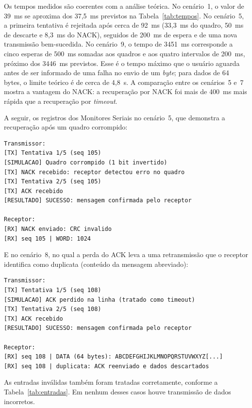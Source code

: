 \documentclass[12pt]{article}
\begin{document}
Os tempos medidos são coerentes com a análise teórica. No cenário~1, o valor de 39~ms se aproxima dos 37,5~ms previstos na Tabela~\ref{tab:tempos}. No cenário~5, a primeira tentativa é rejeitada após cerca de 92~ms (33,3~ms do quadro, 50~ms de descarte e 8,3~ms do NACK), seguidos de 200~ms de espera e de uma nova transmissão bem-sucedida. No cenário~9, o tempo de 3451~ms corresponde a cinco esperas de 500~ms somadas aos quadros e aos quatro intervalos de 200~ms, próximo dos 3446~ms previstos. Esse é o tempo máximo que o usuário aguarda antes de ser informado de uma falha no envio de um \emph{byte}; para dados de 64 bytes, o limite teórico é de cerca de 4,8~s. A comparação entre os cenários~5 e~7 mostra a vantagem do NACK: a recuperação por NACK foi mais de 400~ms mais rápida que a recuperação por \emph{timeout}.

A seguir, os registros dos Monitores Seriais no cenário~5, que demonstra a recuperação após um quadro corrompido:

\begin{small}
\begin{verbatim}
Transmissor:
[TX] Tentativa 1/5 (seq 105)
[SIMULACAO] Quadro corrompido (1 bit invertido)
[TX] NACK recebido: receptor detectou erro no quadro
[TX] Tentativa 2/5 (seq 105)
[TX] ACK recebido
[RESULTADO] SUCESSO: mensagem confirmada pelo receptor

Receptor:
[RX] NACK enviado: CRC invalido
[RX] seq 105 | WORD: 1024
\end{verbatim}
\end{small}

E no cenário~8, no qual a perda do ACK leva a uma retransmissão que o receptor identifica como duplicata (conteúdo da mensagem abreviado):

\begin{small}
\begin{verbatim}
Transmissor:
[TX] Tentativa 1/5 (seq 108)
[SIMULACAO] ACK perdido na linha (tratado como timeout)
[TX] Tentativa 2/5 (seq 108)
[TX] ACK recebido
[RESULTADO] SUCESSO: mensagem confirmada pelo receptor

Receptor:
[RX] seq 108 | DATA (64 bytes): ABCDEFGHIJKLMNOPQRSTUVWXYZ[...]
[RX] seq 108 | duplicata: ACK reenviado e dados descartados
\end{verbatim}
\end{small}

As entradas inválidas também foram tratadas corretamente, conforme a Tabela~\ref{tab:entradas}. Em nenhum desses casos houve transmissão de dados incorretos.
\end{document}
